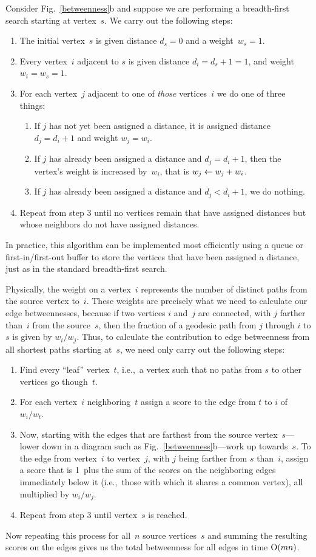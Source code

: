 \documentclass[twocolumn,pre,superscriptaddress]{revtex4}
\begin{document}
Consider Fig.~\ref{betweenness}b and suppose we are performing a
breadth-first search starting at vertex~$s$.  We carry out the following
steps:
\begin{enumerate}
\item The initial vertex~$s$ is given distance $d_s=0$ and a
weight~$w_s=1$.
\item Every vertex~$i$ adjacent to $s$ is given distance $d_i=d_s+1=1$, and
weight $w_i=w_s=1$.
\item For each vertex~$j$ adjacent to one of \emph{those} vertices~$i$ we do
one of three things:
  \begin{enumerate}
  \item If $j$ has not yet been assigned a distance, it is assigned
    distance $d_j=d_i+1$ and weight $w_j=w_i$.
  \item If $j$ has already been assigned a distance and $d_j=d_i+1$, then the
    vertex's weight is increased by~$w_i$, that is $w_j\leftarrow w_j+w_i$.
  \item If $j$ has already been assigned a distance and $d_j<d_i+1$, we do
    nothing.
  \end{enumerate}
\item Repeat from step 3 until no vertices remain that have assigned
distances but whose neighbors do not have assigned distances.
\end{enumerate}
In practice, this algorithm can be implemented most efficiently using a
queue or first-in/first-out buffer to store the vertices that have been
assigned a distance, just as in the standard breadth-first search.

Physically, the weight on a vertex~$i$ represents the number of distinct
paths from the source vertex to~$i$.  These weights are precisely what we
need to calculate our edge betweennesses, because if two vertices $i$
and~$j$ are connected, with $j$ farther than~$i$ from the source~$s$, then
the fraction of a geodesic path from $j$ through $i$ to $s$ is given by
$w_i/w_j$.  Thus, to calculate the contribution to edge betweenness from
all shortest paths starting at~$s$, we need only carry out the following
steps:
\begin{enumerate}
\item Find every ``leaf'' vertex~$t$, i.e.,~a vertex such that no paths
from $s$ to other vertices go though~$t$.
\item For each vertex~$i$ neighboring~$t$ assign a score to the edge from
$t$ to $i$ of $w_i/w_t$.
\item Now, starting with the edges that are farthest from the source
vertex~$s$---lower down in a diagram such as Fig.~\ref{betweenness}b---work
up towards~$s$.  To the edge from vertex~$i$ to vertex~$j$, with $j$ being
farther from $s$ than~$i$, assign a score that is 1~plus the sum of the
scores on the neighboring edges immediately below it (i.e.,~those with
which it shares a common vertex), all multiplied by $w_i/w_j$.
\item Repeat from step 3 until vertex~$s$ is reached.
\end{enumerate}
Now repeating this process for all~$n$ source vertices~$s$ and summing the
resulting scores on the edges gives us the total betweenness for all edges
in time $\mathrm{O}(mn)$.
\end{document}
